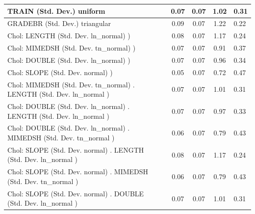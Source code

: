 \begin{table}
\begin{center}
\begin{tabular}{|l|l|c|c|c|l|}
			\hline
			TRAIN (Std. Dev.) uniform &  & 0.07 & 0.07 & 1.02 & 0.31 \\
			\hline
			GRADEBR (Std. Dev.) triangular &  & 0.09 & 0.07 & 1.22 & 0.22 \\
			\hline
			 Chol: LENGTH (Std. Dev. ln_normal) ) &  & 0.08 & 0.07 & 1.17 & 0.24 \\
			\hline
			 Chol: MIMEDSH (Std. Dev. tn_normal) ) &  & 0.07 & 0.07 & 0.91 & 0.37 \\
			\hline
			 Chol: DOUBLE (Std. Dev. ln_normal) ) &  & 0.07 & 0.07 & 0.96 & 0.34 \\
			\hline
			 Chol: SLOPE (Std. Dev. normal) ) &  & 0.05 & 0.07 & 0.72 & 0.47 \\
			\hline
			 Chol: MIMEDSH (Std. Dev. tn_normal) . LENGTH (Std. Dev.   ln_normal ) &  & 0.07 & 0.07 & 1.01 & 0.31 \\
			\hline
			 Chol: DOUBLE (Std. Dev. ln_normal) . LENGTH (Std. Dev.   ln_normal ) &  & 0.07 & 0.07 & 0.97 & 0.33 \\
			\hline
			 Chol: DOUBLE (Std. Dev. ln_normal) . MIMEDSH (Std. Dev.   tn_normal ) &  & 0.06 & 0.07 & 0.79 & 0.43 \\
			\hline
			 Chol: SLOPE (Std. Dev. normal) . LENGTH (Std. Dev.   ln_normal ) &  & 0.08 & 0.07 & 1.17 & 0.24 \\
			\hline
			 Chol: SLOPE (Std. Dev. normal) . MIMEDSH (Std. Dev.   tn_normal ) &  & 0.06 & 0.07 & 0.79 & 0.43 \\
			\hline
			 Chol: SLOPE (Std. Dev. normal) . DOUBLE (Std. Dev.   ln_normal ) &  & 0.07 & 0.07 & 1.01 & 0.31 \\
			\hline
		\end{tabular}
	\end{center}
\end{table}
